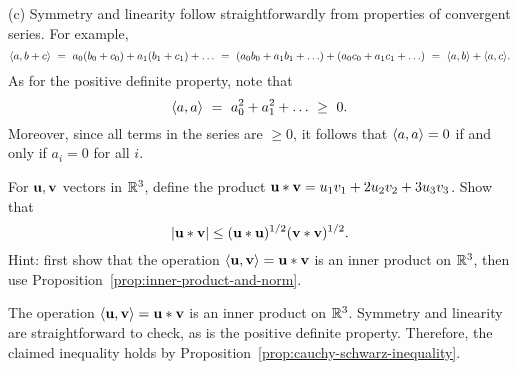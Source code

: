 \begin{ex}
\begin{sol}
    (c) Symmetry and linearity follow straightforwardly from
    properties of convergent series. For example,
    \begin{equation*}
      \langle a,b+c\rangle
      ~=~ a_0(b_0+c_0) + a_1(b_1+c_1) + \ldots
      ~=~ (a_0b_0 + a_1b_1 + \ldots) + (a_0c_0 + a_1c_1 + \ldots)
      ~=~ \langle a,b\rangle + \langle a,c\rangle.
    \end{equation*}
    As for the positive definite property, note that
    \begin{equation*}
      \langle a,a\rangle
      ~=~ a_0^2 + a_1^2 + \ldots
      ~\geq~ 0.      
    \end{equation*}
    Moreover, since all terms in the series are $\geq 0$, it follows
    that $\langle a,a\rangle=0$ if and only if $a_i=0$ for all $i$.
  \end{sol}
\end{ex}

\begin{ex}
  For $\vect{u},\vect{v}$ vectors in $\mathbb{R}^{3}$, define the product
  $\vect{u}\ast \vect{v} = u_{1}v_{1}+2u_{2}v_{2}+3u_{3}v_{3}$. Show
  that 
  \begin{equation*}
    \abs{\vect{u}\ast \vect{v}} \leq (\vect{u}\ast \vect{u})
    ^{1/2}(\vect{v}\ast \vect{v}) ^{1/2}.
  \end{equation*}
  Hint: first show that the operation
  $\iprod{\vect{u},\vect{v}}=\vect{u}\ast\vect{v}$ is an inner product
  on $\mathbb{R}^{3}$, then use Proposition~\ref{prop:inner-product-and-norm}.
  \begin{sol}
    The operation $\iprod{\vect{u},\vect{v}}=\vect{u}\ast\vect{v}$ is
    an inner product on $\mathbb{R}^{3}$. Symmetry and linearity are
    straightforward to check, as is the positive definite
    property. Therefore, the claimed inequality holds by
    Proposition~\ref{prop:cauchy-schwarz-inequality}.
  \end{sol}
\end{ex}

